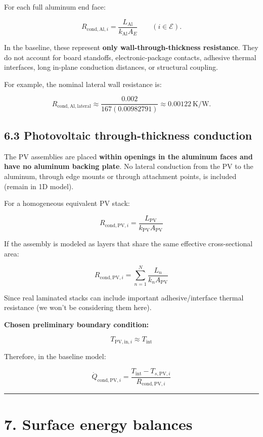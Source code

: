 \documentclass[
]{book}
\begin{document}
For each full aluminum end face:

\[
\boxed{
R_{\mathrm{cond,Al},i}
=\frac{L_{\mathrm{Al}}}
{k_{\mathrm{Al}}A_E}
}
\qquad(i\in\mathcal E).
\]

In the baseline, these represent \textbf{only wall-through-thickness resistance}. They do not account for board standoffs, electronic-package contacts, adhesive thermal interfaces, long in-plane conduction distances, or structural coupling.

For example, the nominal lateral wall resistance is:

\[
R_{\mathrm{cond,Al,lateral}}
\approx\frac{0.002}{167(0.00982791)}
\approx0.00122\ \mathrm{K/W}.
\]

\subsection{6.3 Photovoltaic through-thickness conduction}\label{photovoltaic-through-thickness-conduction}

The PV assemblies are placed \textbf{within openings in the aluminum faces and have no aluminum backing plate}. No lateral conduction from the PV to the aluminum, through edge mounts or through attachment points, is included (remain in 1D model).

For a homogeneous equivalent PV stack:

\[
\boxed{
R_{\mathrm{cond,PV},i}
=\frac{L_{\mathrm{PV}}}
{k_{\mathrm{PV}}A_{\mathrm{PV}}}
}
\]

If the assembly is modeled as layers that share the same effective cross-sectional area:

\[
\boxed{
R_{\mathrm{cond,PV},i}
=\sum_{n=1}^{N}
\frac{L_n}{k_nA_{\mathrm{PV}}}
}
\]

Since real laminated stacks can include important adhesive/interface thermal resistance (we won't be considering them here).

\textbf{Chosen preliminary boundary condition:}

\[
\boxed{T_{\mathrm{PV,in},i}\approx T_{\mathrm{int}}}
\]

Therefore, in the baseline model:

\[
\boxed{
\dot Q_{\mathrm{cond,PV},i}
=\frac{T_{\mathrm{int}}-T_{s,\mathrm{PV},i}}
{R_{\mathrm{cond,PV},i}}
}
\]

\begin{center}\rule{0.5\linewidth}{0.5pt}\end{center}

\section{7. Surface energy balances}\label{surface-energy-balances}
\end{document}
